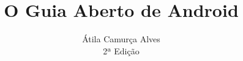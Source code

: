 \documentclass[a4paper,11pt]{book}
\title{O Guia Aberto de Android}
\author{Átila Camurça Alves\\2ª Edição}
\begin{document}
\maketitle
\tableofcontents
\listoflistings
\listoftables









\printglossary
\end{document}
